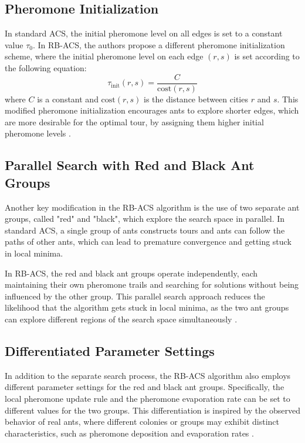 \subsection{Pheromone Initialization}
In standard \Gls{ACS}, the initial pheromone level on all edges is set to a constant value $\tau_0$. In \Gls{RB-ACS}, the authors propose a different pheromone initialization scheme, where the initial pheromone level on each edge $(r,s)$ is set according to the following equation:
\begin{equation}
	\tau_\text{init}(r,s) = \frac{C}{\text{cost}(r,s)}
\end{equation}
where $C$ is a constant and $\text{cost}(r,s)$ is the distance between cities $r$ and $s$. This modified pheromone initialization encourages ants to explore shorter edges, which are more desirable for the optimal tour, by assigning them higher initial pheromone levels \cite{Hassan2013}.

\subsection{Parallel Search with Red and Black Ant Groups}
Another key modification in the \Gls{RB-ACS} algorithm is the use of two separate ant groups, called "red" and "black", which explore the search space in parallel. In standard \Gls{ACS}, a single group of ants constructs tours and ants can follow the paths of other ants, which can lead to premature convergence and getting stuck in local minima.

In \Gls{RB-ACS}, the red and black ant groups operate independently, each maintaining their own pheromone trails and searching for solutions without being influenced by the other group. This parallel search approach reduces the likelihood that the algorithm gets stuck in local minima, as the two ant groups can explore different regions of the search space simultaneously \cite{Hassan2013}.

\subsection{Differentiated Parameter Settings}
In addition to the separate search process, the \Gls{RB-ACS} algorithm also employs different parameter settings for the red and black ant groups. Specifically, the local pheromone update rule and the pheromone evaporation rate can be set to different values for the two groups. This differentiation is inspired by the observed behavior of real ants, where different colonies or groups may exhibit distinct characteristics, such as pheromone deposition and evaporation rates \cite{Hassan2013}.

